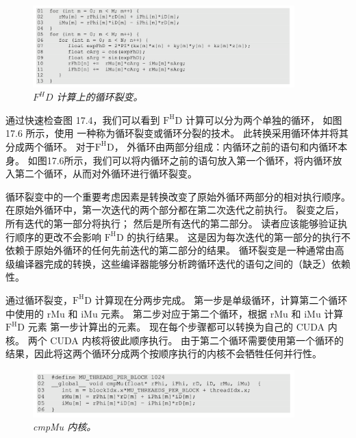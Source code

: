 \begin{figure}[H]
	\centering
	\includegraphics[width=0.9\textwidth]{figs/F17.6.png}
	\caption{\textit{$F^H D$ 计算上的循环裂变。}}
\end{figure}

通过快速检查图 17.4，我们可以看到 $\mathrm{F}^{\mathrm{H}} \mathrm{D}$ 计算可以分为两个单独的循环，
如图 17.6 所示，使用 一种称为循环裂变或循环分裂的技术。 
此转换采用循环体并将其分成两个循环。 对于$\mathrm{F}^{\mathrm{H}} \mathrm{D}$，
外循环由两部分组成：内循环之前的语句和内循环本身。 
如图17.6所示，我们可以将内循环之前的语句放入第一个循环，将内循环放入第二个循环，从而对外循环进行循环裂变。

循环裂变中的一个重要考虑因素是转换改变了原始外循环两部分的相对执行顺序。 
在原始外循环中，第一次迭代的两个部分都在第二次迭代之前执行。 
裂变之后，所有迭代的第一部分将执行； 然后是所有迭代的第二部分。 
读者应该能够验证执行顺序的更改不会影响 $\mathrm{F}^{\mathrm{H}} \mathrm{D}$ 的执行结果。 
这是因为每次迭代的第一部分的执行不依赖于原始外循环的任何先前迭代的第二部分的结果。 
循环裂变是一种通常由高级编译器完成的转换，这些编译器能够分析跨循环迭代的语句之间的（缺乏）依赖性。

通过循环裂变，$\mathrm{F}^{\mathrm{H}} \mathrm{D}$ 计算现在分两步完成。 
第一步是单级循环，计算第二个循环中使用的 $\mathrm{rMu}$ 和 $\mathrm{iMu}$ 元素。 
第二步对应于第二个循环，根据 $\mathrm{rMu}$ 和 $\mathrm{iMu}$ 
计算 $\mathrm{F}^{\mathrm{H}} \mathrm{D}$ 元素 第一步计算出的元素。 现在每个步骤都可以转换为自己的 CUDA 内核。 
两个 CUDA 内核将彼此顺序执行。 
由于第二个循环需要使用第一个循环的结果，因此将这两个循环分成两个按顺序执行的内核不会牺牲任何并行性。

\begin{figure}[H]
	\centering
	\includegraphics[width=0.9\textwidth]{figs/F17.7.png}
	\caption{\textit{cmpMu 内核。}}
\end{figure}

